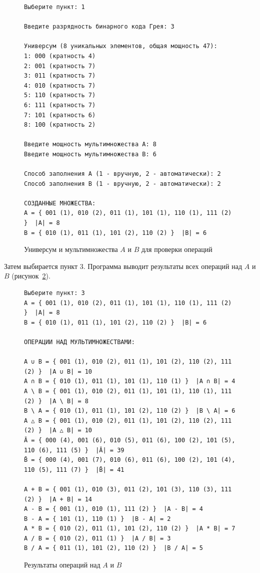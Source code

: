 \documentclass[14pt,a4paper]{extarticle}
\newcommand{\codefont}{\renewcommand{\baselinestretch}{1}\monofont\fontsize{10}{12}\selectfont}
\begin{document}
\begin{figure}[H]
\begin{Verbatim}[frame=single,framesep=4pt,breaklines=true,formatcom=\codefont]
Выберите пункт: 1

Введите разрядность бинарного кода Грея: 3

Универсум (8 уникальных элементов, общая мощность 47):
1: 000 (кратность 4)
2: 001 (кратность 7)
3: 011 (кратность 7)
4: 010 (кратность 7)
5: 110 (кратность 7)
6: 111 (кратность 7)
7: 101 (кратность 6)
8: 100 (кратность 2)

Введите мощность мультимножества A: 8
Введите мощность мультимножества B: 6

Способ заполнения A (1 - вручную, 2 - автоматически): 2
Способ заполнения B (1 - вручную, 2 - автоматически): 2

СОЗДАННЫЕ МНОЖЕСТВА:
A = { 001 (1), 010 (2), 011 (1), 101 (1), 110 (1), 111 (2) }  |A| = 8
B = { 010 (1), 011 (1), 101 (2), 110 (2) }  |B| = 6
\end{Verbatim}
\caption{Универсум и мультимножества $A$ и $B$ для проверки операций}\label{fig:ops_u}
\end{figure}

Затем выбирается пункт 3. Программа выводит результаты всех операций над $A$ и $B$ (рисунок~\ref{fig:ops}).

\begin{figure}[H]
\begin{Verbatim}[frame=single,framesep=4pt,breaklines=true,formatcom=\codefont]
Выберите пункт: 3
A = { 001 (1), 010 (2), 011 (1), 101 (1), 110 (1), 111 (2) }  |A| = 8
B = { 010 (1), 011 (1), 101 (2), 110 (2) }  |B| = 6

ОПЕРАЦИИ НАД МУЛЬТИМНОЖЕСТВАМИ:

A ∪ B = { 001 (1), 010 (2), 011 (1), 101 (2), 110 (2), 111 (2) }  |A ∪ B| = 10
A ∩ B = { 010 (1), 011 (1), 101 (1), 110 (1) }  |A ∩ B| = 4
A \ B = { 001 (1), 010 (2), 011 (1), 101 (1), 110 (1), 111 (2) }  |A \ B| = 8
B \ A = { 010 (1), 011 (1), 101 (2), 110 (2) }  |B \ A| = 6
A △ B = { 001 (1), 010 (2), 011 (1), 101 (2), 110 (2), 111 (2) }  |A △ B| = 10
Ā = { 000 (4), 001 (6), 010 (5), 011 (6), 100 (2), 101 (5), 110 (6), 111 (5) }  |Ā| = 39
B̄ = { 000 (4), 001 (7), 010 (6), 011 (6), 100 (2), 101 (4), 110 (5), 111 (7) }  |B̄| = 41

A + B = { 001 (1), 010 (3), 011 (2), 101 (3), 110 (3), 111 (2) }  |A + B| = 14
A - B = { 001 (1), 010 (1), 111 (2) }  |A - B| = 4
B - A = { 101 (1), 110 (1) }  |B - A| = 2
A * B = { 010 (2), 011 (1), 101 (2), 110 (2) }  |A * B| = 7
A / B = { 010 (2), 011 (1) }  |A / B| = 3
B / A = { 011 (1), 101 (2), 110 (2) }  |B / A| = 5
\end{Verbatim}
\caption{Результаты операций над $A$ и $B$}\label{fig:ops}
\end{figure}
\end{document}
